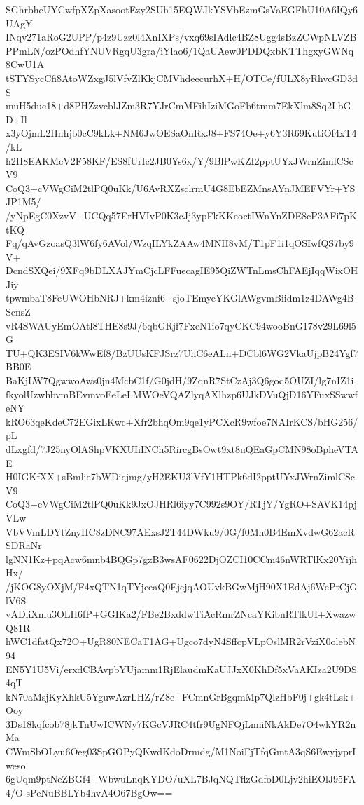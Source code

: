 SGhrbheUYCwfpXZpXasootEzy2SUh15EQWJkYSVbEzmGsVaEGFhU10A6IQy6UAgY
INqv271aRoG2UPP/p4z9Uzz0l4XnIXPs/vxq69sIAdlc4BZ8Ugg4sBzZCWpNLVZB
PPmLN/ozPOdhfYNUVRgqU3gra/iYlao6/1QaUAew0PDDQxbKTThgxyGWNq8CwU1A
tSTYSycCfi8AtoWZxgJ5lVfvZlKkjCMVhdeecurhX+H/OTCe/fULX8yRhvcGD3dS
muH5due18+d8PHZzvcblJZm3R7YJrCmMFihIziMGoFb6tmm7EkXlm8Sq2LbGD+Il
x3yOjmL2Hnhjb0cC9kLk+NM6JwOESaOnRxJ8+FS74Oe+y6Y3R69KutiOf4xT4/kL
h2H8EAKMcV2F58KF/ES8fUrIc2JB0Ys6x/Y/9BlPwKZI2pptUYxJWrnZimlCScV9
CoQ3+cVWgCiM2tlPQ0uKk/U6AvRXZsclrmU4G8EbEZMnsAYnJMEFVYr+YSJP1M5/
/yNpEgC0XzvV+UCQq57ErHVIvP0K3cJj3ypFkKKeoctIWnYnZDE8cP3AFi7pKtKQ
Fq/qAvGzoasQ3lW6fy6AVol/WzqILYkZAAw4MNH8vM/T1pF1i1qOSIwfQS7by9V+
DcndSXQei/9XFq9bDLXAJYmCjcLFFuecagIE95QiZWTnLmsChFAEjIqqWixOHJiy
tpwmbaT8FeUWOHbNRJ+km4iznf6+sjoTEmyeYKGlAWgvmBiidm1z4DAWg4BScnsZ
vR4SWAUyEmOAtl8THE8s9J/6qbGRjf7FxeN1io7qyCKC94wooBnG178v29L69l5G
TU+QK3ESIV6kWwEf8/BzUUsKFJSrz7UhC6eALn+DCbl6WG2VkaUjpB24Ygf7BB0E
BaKjLW7QgwwoAws0jn4McbC1f/G0jdH/9ZqnR7StCzAj3Q6goq5OUZI/lg7nIZ1i
fkyolUzwhbvmBEvmvoEeLeLMWOeVQAZlyqAXlhzp6UJkDVuQjD16YFuxSSwwfeNY
kRO63qeKdeC72EGixLKwc+Xfr2bhqOm9qe1yPCXcR9wfoe7NAIrKCS/bHG256/pL
dLxgfd/7J25nyOlAShpVKXUIiINCh5RircgBsOwt9xt8uQEaGpCMN98oBpheVTAE
H0IGKfXX+sBmlie7bWDicjmg/yH2EKU3lVfY1HTPk6dI2pptUYxJWrnZimlCScV9
CoQ3+cVWgCiM2tlPQ0uKk9JxOJHRl6iyy7C992s9OY/RTjY/YgRO+SAVK14pjVLw
VbVVmLDYtZnyHC8zDNC97AExsJ2T44DWku9/0G/f0Mn0B4EmXvdwG62acRSDRaNr
lgNN1Kz+pqAcw6mnb4BQGp7gzB3wsAF0622DjOZCI10CCm46nWRTlKx20YijhHx/
/jKOG8yOXjM/F4xQTN1qTYjceaQ0EjejqAOUvkBGwMjH90X1EdAj6WePtCjGlV6S
vADliXmu3OLH6fP+GGIKa2/FBe2BxddwTiAcRmrZNcaYKibnRTlkUI+XwazwQ81R
hWC1dfatQx72O+UgR80NECaT1AG+Ugco7dyN4SffcpVLpOslMR2rVziX0olebN94
EN5Y1U5Vi/erxdCBAvpbYUjamm1RjElaudmKaUJJxX0KhDf5xVaAKIza2U9DS4qT
kN70aMsjKyXhkU5YguwAzrLHZ/rZ8e+FCmnGrBgqmMp7QlzHbF0j+gk4tLsk+Ooy
3Ds18kqfcob78jkTnUwICWNy7KGcVJRC4tfr9UgNFQjLmiiNkAkDe7O4wkYR2nMa
CWmSbOLyu6Oeg03SpGOPyQKwdKdoDrmdg/M1NoiFjTfqGmtA3qS6EwyjyprIweso
6gUqm9ptNeZBGf4+WbwuLnqKYDO/uXL7BJqNQTflzGdfoD0Ljv2hiEOlJ95FA4/O
sPeNuBBLYb4hvA4O67BgOw==
